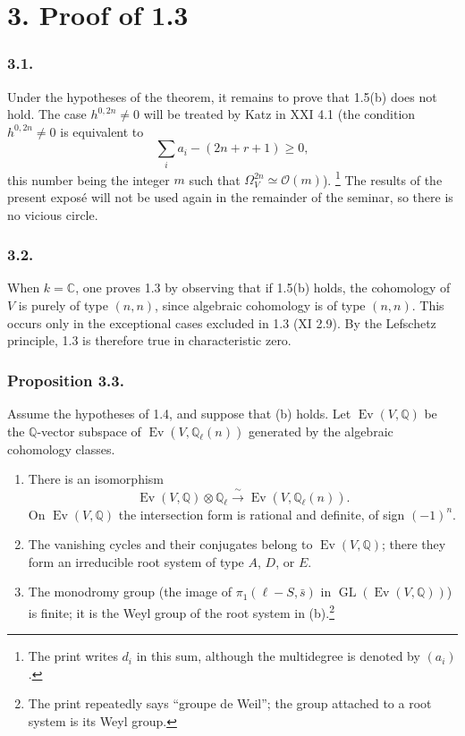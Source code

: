 \section*{3. Proof of 1.3}

\subsubsection*{3.1.}
Under the hypotheses of the theorem, it remains to prove that 1.5(b) does
not hold.  The case $h^{0,2n}\ne0$ will be treated by Katz in XXI 4.1 (the
condition $h^{0,2n}\ne0$ is equivalent to
\[
  \sum_i a_i-(2n+r+1)\geq0,
\]
this number being the integer $m$ such that
$\Omega_V^{2n}\simeq\mathcal O(m)$).
\footnote{The print writes $d_i$ in this sum, although the multidegree is
denoted by $(a_i)$.}
The results of the present expos\'e will not be used again in the remainder
of the seminar, so there is no vicious circle.

\subsubsection*{3.2.}
When $k=\mathbb C$, one proves 1.3 by observing that if 1.5(b) holds, the
cohomology of $V$ is purely of type $(n,n)$, since algebraic cohomology is
of type $(n,n)$.  This occurs only in the exceptional cases excluded in
1.3 (XI 2.9).  By the Lefschetz principle, 1.3 is therefore true in
characteristic zero.

\subsubsection*{Proposition 3.3.}
Assume the hypotheses of 1.4, and suppose that (b) holds.  Let
$\operatorname{Ev}(V,\mathbb Q)$ be the $\mathbb Q$-vector subspace of
$\operatorname{Ev}(V,\mathbb Q_\ell(n))$ generated by the algebraic
cohomology classes.

\begin{enumerate}[label=(\alph*)]
\item There is an isomorphism
  \[
  \operatorname{Ev}(V,\mathbb Q)\otimes\mathbb Q_\ell
  \xrightarrow{\ \sim\ }
  \operatorname{Ev}(V,\mathbb Q_\ell(n)).
  \]
  On $\operatorname{Ev}(V,\mathbb Q)$ the intersection form is rational
  and definite, of sign $(-1)^n$.
\item The vanishing cycles and their conjugates belong to
  $\operatorname{Ev}(V,\mathbb Q)$; there they form an irreducible root
  system of type $A$, $D$, or $E$.
\item The monodromy group (the image of $\pi_1(\ell-S,\bar s)$ in
  $\operatorname{GL}(\operatorname{Ev}(V,\mathbb Q))$) is finite; it is the
  Weyl group of the root system in (b).\footnote{The print repeatedly says
  ``groupe de Weil''; the group attached to a root system is its Weyl
  group.}
\end{enumerate}

